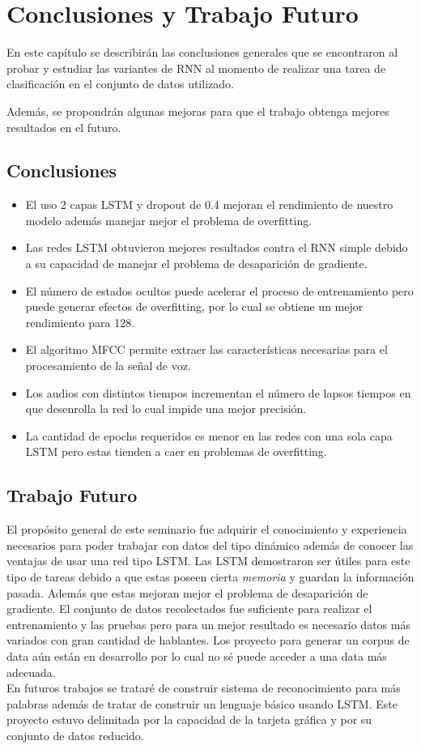 \chapter{Conclusiones y Trabajo Futuro}
En este capítulo se describirán las conclusiones generales que se encontraron al probar y estudiar las variantes de RNN al momento de realizar una tarea de clasificación en el conjunto de datos utilizado.

Además, se propondrán algunas mejoras para que el trabajo obtenga mejores
resultados en el futuro.

\section{Conclusiones}

\begin{itemize}
	\item El uso 2 capas LSTM y dropout de 0.4 mejoran el rendimiento de nuestro modelo además manejar mejor el problema de overfitting.
	\item Las redes LSTM obtuvieron mejores resultados contra el RNN simple debido a su capacidad de manejar el problema de desaparición de gradiente.
	\item El número de estados ocultos puede acelerar el proceso de entrenamiento pero puede generar efectos de overfitting, por lo cual se obtiene un mejor rendimiento para 128.
	\item El algoritmo MFCC permite extraer las características necesarias para el procesamiento de la señal de voz.
	\item Los audios con distintos tiempos incrementan el número de lapsos tiempos en que desenrolla la red lo cual impide una mejor precisión.
	\item La cantidad de epochs requeridos es menor en las redes con una sola capa LSTM pero estas tienden a caer en problemas de overfitting.	
	
	
\end{itemize}

\section{Trabajo Futuro}

El propósito general de este seminario  fue adquirir el conocimiento y
experiencia necesarios para poder trabajar con datos del tipo dinámico además de conocer las ventajas de usar una red tipo LSTM.
Las LSTM demostraron ser útiles para este tipo de tareas debido a que estas poseen cierta \textit{memoria} y guardan la información pasada. Además que estas mejoran mejor el problema de desaparición de gradiente.
El conjunto de datos recolectados fue suficiente para realizar el entrenamiento y las pruebas pero para un mejor resultado es necesario datos más variados con gran cantidad de hablantes. Los proyecto para generar un corpus de data aún están en desarrollo por lo cual no sé puede acceder a una data más adecuada.\\
En futuros trabajos se trataré de construir sistema de reconocimiento para más palabras además de tratar de construir un lenguaje básico usando LSTM. Este proyecto estuvo delimitada por la capacidad de la tarjeta gráfica y por su conjunto de datos reducido. 

